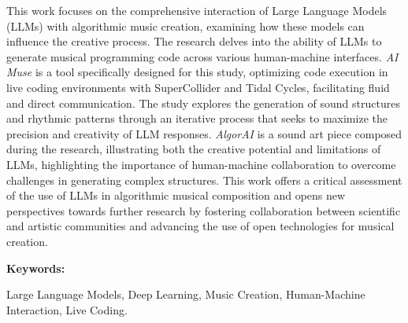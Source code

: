     This work focuses on the comprehensive interaction of Large Language Models (LLMs) with algorithmic music creation, examining how these models can influence the creative process. The research delves into the ability of LLMs to generate musical programming code across various human-machine interfaces. \emph{AI Muse} is a tool specifically designed for this study, optimizing code execution in live coding environments with SuperCollider and Tidal Cycles, facilitating fluid and direct communication. The study explores the generation of sound structures and rhythmic patterns through an iterative process that seeks to maximize the precision and creativity of LLM responses. \emph{AlgorAI} is a sound art piece composed during the research, illustrating both the creative potential and limitations of LLMs, highlighting the importance of human-machine collaboration to overcome challenges in generating complex structures. This work offers a critical assessment of the use of LLMs in algorithmic musical composition and opens new perspectives towards further research by fostering collaboration between scientific and artistic communities and advancing the use of open technologies for musical creation.
  
    \vspace{1cm}
    \textbf{Keywords:} %
    
    Large Language Models, Deep Learning, Music Creation, Human-Machine Interaction, Live Coding.
  
